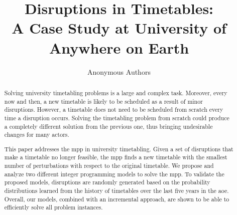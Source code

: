 \documentclass[runningheads]{llncs}
\title{Disruptions in Timetables: \\ \large  A Case Study at University of Anywhere on Earth} %
\author{Anonymous Authors}
\institute{University of Anywhere on Earth}
\newcommand{\uni}{\gls{aoe}}
\begin{document}
\maketitle 

\begin{abstract}
Solving university timetabling problems is a large and complex task. Moreover, every now and then, a new timetable is likely to be scheduled as a result of minor disruptions. However, a timetable does not need to be scheduled from scratch every time a disruption occurs. Solving the timetabling problem from scratch could produce a completely different solution from the previous one, thus bringing undesirable changes for many actors. 

This paper addresses the \gls{mpp} in university timetabling. Given a set of disruptions that make a timetable no longer feasible, the \gls{mpp} finds a new timetable with the smallest number of perturbations with respect to the original timetable. We propose and analyze two different integer programming models to solve the \gls{mpp}. To validate the proposed models, disruptions are randomly generated based on the probability distributions learned from the history of timetables over the last five years in the \uni. Overall, our models, combined with an incremental approach, are shown to be able to efficiently solve all problem instances.



   


\end{abstract}
\end{document}
